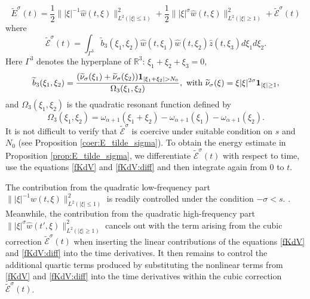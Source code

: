 \documentclass{amsart}
\theoremstyle{definition}
\theoremstyle{remark}
\numberwithin{equation}{section}
\begin{document}
\[ \widetilde{E}^\sigma(t) = \frac 12\||\xi|^{-1}\widehat{w}(t,\xi)\|_{L^2(|\xi|\le 1)}^2 + \frac 12\||\xi|^{\sigma}\widehat{w}(t,\xi)\|_{L^2(|\xi| \ge 1)}^2+ \widetilde{\mathcal{E}}^\sigma(t) \]
where
\[ \widetilde{\mathcal{E}}^\sigma(t) = \int_{\Gamma^3} \widetilde{b}_3(\xi_1,\xi_2) \widehat{w}(t,\xi_1) \widehat{w}(t,\xi_2)\widehat{z}(t,\xi_3)d\xi_1d\xi_2 . \]
Here $\Gamma^3$ denotes the hyperplane of $\mathbb R^3$: $\xi_1+\xi_2+\xi_3=0$, 
\[ \widetilde{b}_3(\xi_1,\xi_2) = \frac{ (\widetilde{\nu}_\sigma(\xi_1) + \widetilde{\nu}_\sigma(\xi_2)){\bf 1}_{|\xi_1+\xi_2|>N_0}}{\Omega_3(\xi_1,\xi_2)}, \ \text{with} \ \widetilde{\nu}_\sigma(\xi)=\xi|\xi|^{2\sigma} {\bf 1}_{|\xi|\ge 1}, \]
and $\Omega_3(\xi_1,\xi_2)$ is the quadratic resonant function defined by 
\[ \Omega_3(\xi_1,\xi_2)=\omega_{\alpha+1}(\xi_1+\xi_2)-\omega_{\alpha+1}(\xi_1)-\omega_{\alpha+1}(\xi_2). \]
It is not difficult to verify that $\widetilde{\mathcal{E}}^\sigma$ is coercive under suitable condition on $s$ and $N_0$ (see Proposition \ref{coer:E_tilde_sigma}). To obtain the energy estimate in Proposition \ref{prop:E_tilde_sigma}, we differentiate $\widetilde{\mathcal{E}}^\sigma(t)$ with respect to time, use the equations \eqref{fKdV} and \eqref{fKdV:diff} and then integrate again from $0$ to $t$. 

The contribution from the quadratic low-frequency part $\||\xi|^{-1}\widehat{w}(t,\xi)\|_{L^2(|\xi|\le 1)}^2$ is readily controlled under the condition $-\sigma<s$. . Meanwhile, the contribution from the quadratic high-frequency part $\||\xi|^{\sigma}\widehat{w}(t',\xi)\|_{L^2(|\xi| \ge 1)}^2$ cancels out with the term arising from the cubic correction $\widetilde{\mathcal{E}}^\sigma(t)$ when inserting the linear contributions of the equations  \eqref{fKdV} and \eqref{fKdV:diff} into the time derivatives. It then remains to control the additional quartic terms produced by substituting the nonlinear terms from \eqref{fKdV} and \eqref{fKdV:diff} into the time derivatives within the cubic correction $\widetilde{\mathcal{E}}^\sigma(t)$.
\end{document}
